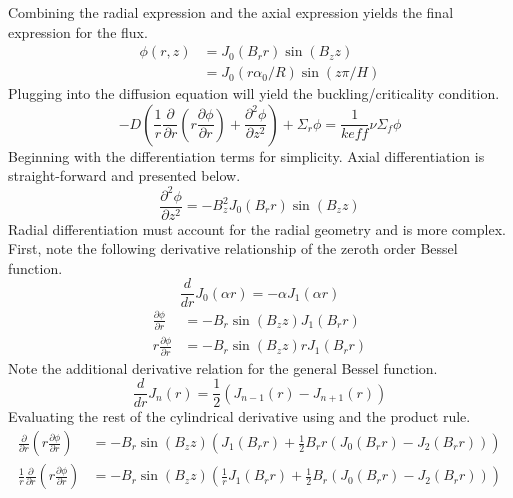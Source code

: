   Combining the radial expression  and the axial 
  expression  yields the final expression for the flux.
  \begin{align} \label{eq:cyl_flux}
    \phi(r,z) &= J_0(B_r r) \sin(B_z z) \\
    &= J_0(r \alpha_0 / R) \sin(z \pi / H)
  \end{align}
  Plugging  into the diffusion equation will yield the 
  buckling/criticality condition.
  \begin{equation}
    -D \left( \frac{1}{r} \frac{\partial}{\partial r} \left( r 
      \frac{\partial \phi}{\partial r} \right) + \frac{\partial^2 \phi}
      {\partial z^2} \right) + \Sigma_r \phi = \frac{1}{keff} \nu 
      \Sigma_f \phi
  \end{equation}
  Beginning with the differentiation terms for simplicity. Axial 
  differentiation is straight-forward and presented below.
  \begin{equation}
    \frac{\partial^2 \phi}{\partial z^2} = -B_z^2 J_0(B_r r) \sin(B_z z)
  \end{equation}
  Radial differentiation must account for the radial geometry and is more 
  complex. First, note the following derivative relationship of the zeroth
  order Bessel function.
  \begin{equation} \label{eq:deriv_bessel0}
    \frac{d}{dr} J_0(\alpha r) = - \alpha J_1(\alpha r)
  \end{equation}
  \begin{align}
    \frac{\partial \phi}{\partial r} &= -B_r \sin(B_z z) J_1(B_r r) \\
    r \frac{\partial \phi}{\partial r} &= -B_r \sin(B_z z) r J_1 (B_r r) 
  \end{align}
  Note the additional derivative relation for the general Bessel function.
  \begin{equation} \label{eq:deriv_besseln}
    \frac{d}{dr} J_n(r) = \frac{1}{2} \left( J_{n-1}(r) - J_{n+1}(r)\right)
  \end{equation}
  Evaluating the rest of the cylindrical derivative using
   and the product rule.
  \begin{align}
    \frac{\partial}{\partial r} \left( r \frac{\partial \phi}{\partial r}
      \right) &= -B_r \sin(B_z z) \left(J_1(B_r r) + \frac{1}{2} B_r r \left(
      J_0(B_r r) - J_2(B_r r) \right) \right) \\
    \frac{1}{r} \frac{\partial}{\partial r} \left(r 
      \frac{\partial \phi}{\partial r} \right) &=
      -B_r \sin(B_z z) \left(\frac{1}{r} J_1(B_r r) + \frac{1}{2} B_r \left(
      J_0(B_r r) - J_2(B_r r) \right) \right)
  \end{align}
